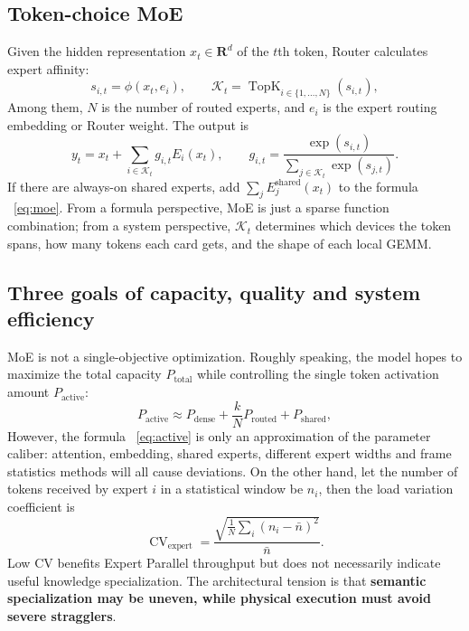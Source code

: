 \documentclass[10pt,a4paper,fontset=none]{ctexart}
\newcommand{\term}[1]{\textbf{#1}}
\begin{document}
\subsection{Token-choice MoE}

Given the hidden representation $x_t\in\mathbf{R}^{d}$ of the $t$th token, Router calculates expert affinity:
\begin{equation}
  s_{i,t}=\phi(x_t,e_i),\qquad
  \mathcal{K}_t=\operatorname{TopK}_{i\in\{1,\ldots,N\}}(s_{i,t}),
  \label{eq:router}
\end{equation}
Among them, $N$ is the number of routed experts, and $e_i$ is the expert routing embedding or Router weight. The output is
\begin{equation}
  y_t=x_t+\sum_{i\in\mathcal{K}_t}g_{i,t}E_i(x_t),
  \qquad
  g_{i,t}=\frac{\exp(s_{i,t})}{\sum_{j\in\mathcal{K}_t}\exp(s_{j,t})}.
  \label{eq:moe}
\end{equation}
If there are always-on shared experts, add $\sum_j E^{\mathrm{shared}}_j(x_t)$ to the formula ~\eqref{eq:moe}. From a formula perspective, MoE is just a sparse function combination; from a system perspective, $\mathcal{K}_t$ determines which devices the token spans, how many tokens each card gets, and the shape of each local GEMM.

\subsection{Three goals of capacity, quality and system efficiency}

MoE is not a single-objective optimization. Roughly speaking, the model hopes to maximize the total capacity $P_{\mathrm{total}}$ while controlling the single token activation amount $P_{\mathrm{active}}$:
\begin{equation}
  P_{\mathrm{active}} \approx P_{\mathrm{dense}}
  +\frac{k}{N}P_{\mathrm{routed}}+P_{\mathrm{shared}},
  \label{eq:active}
\end{equation}
However, the formula ~\eqref{eq:active} is only an approximation of the parameter caliber: attention, embedding, shared experts, different expert widths and frame statistics methods will all cause deviations. On the other hand, let the number of tokens received by expert $i$ in a statistical window be $n_i$, then the load variation coefficient is
\begin{equation}
  \operatorname{CV}_{\mathrm{expert}}
  =\frac{\sqrt{\frac{1}{N}\sum_i(n_i-\bar n)^2}}{\bar n}.
  \label{eq:cv}
\end{equation}
Low CV benefits Expert Parallel throughput but does not necessarily indicate useful knowledge specialization. The architectural tension is that \term{semantic specialization may be uneven, while physical execution must avoid severe stragglers}.
\end{document}
